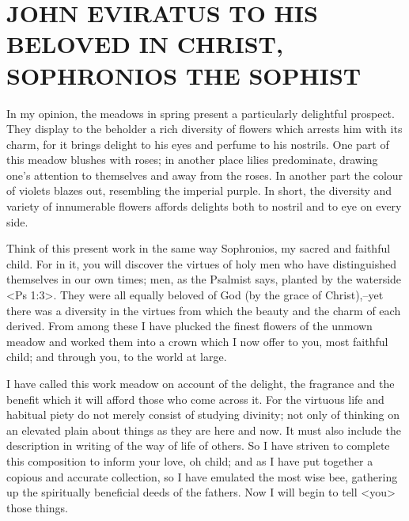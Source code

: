 \chapter{JOHN EVIRATUS \break \break TO HIS BELOVED IN CHRIST, SOPHRONIOS THE SOPHIST}

In my opinion, the meadows in spring present a particularly delightful prospect.
They display to the beholder a rich diversity of flowers which arrests him with its charm, for it brings delight to his eyes and perfume to his nostrils.
One part of this meadow blushes with roses; in another place lilies predominate, drawing one's attention to themselves and away from the roses.
In another part the colour of violets blazes out, resembling the imperial purple.
In short, the diversity and variety of innumerable flowers affords
delights both to nostril and to eye on every side.

Think of this present work in the same way Sophronios, my sacred and faithful child.
For in it, you will discover the virtues of holy men who have distinguished themselves in our own times;
men, as the Psalmist says, planted by the waterside <Ps 1:3>.
They were all equally beloved of God (by the grace of Christ),--yet there was a diversity in the virtues from which the beauty and the charm of each derived.
From among these I have plucked the finest flowers of the unmown meadow and worked them into a crown which I now offer to you, most faithful child; and through you, to the world at large.

I have called this work meadow on account of the delight, the fragrance and the benefit which it will afford those who come across
it.
For the virtuous life and habitual piety do not merely consist of
studying divinity; not only of thinking on an elevated plain about
things as they are here and now.
It must also include the description in writing of the way of life of others.
So I have striven to complete this composition to inform your love, oh child;
and as I have put together a copious and accurate collection, so I have emulated the most wise bee, gathering up the spiritually beneficial deeds of the fathers.
Now I will begin to tell <you> those things.
